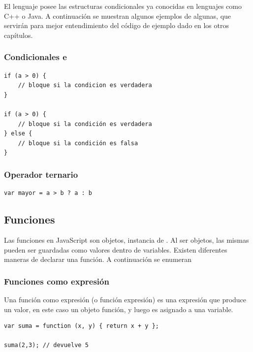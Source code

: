 El lenguaje posee las estructuras condicionales ya conocidas en lenguajes como C++ o Java. A continuación se muestran algunos ejemplos de algunas, que servirán para mejor entendimiento del código de ejemplo dado en los otros capítulos.

\subsubsection{Condicionales  e }

\begin{lstlisting}[title={Ejemplos de \code{if} e \code{if-else}}]
if (a > 0) {
	// bloque si la condicion es verdadera 
}

if (a > 0) {
	// bloque si la condición es verdadera
} else {
	// bloque si la condición es falsa
}
\end{lstlisting}

\subsubsection{Operador ternario }

\begin{lstlisting}[title={Operador ternario \code{?:}}]
var mayor = a > b ? a : b
\end{lstlisting}

\subsection{Funciones}
\label{sec:funciones}

Las funciones en JavaScript son objetos, instancia de . Al ser objetos, las mismas pueden ser guardadas como valores dentro de variables. Existen diferentes maneras de declarar una función. A continuación se enumeran 

\subsubsection{Funciones como expresión}

Una función como expresión (o función expresión) es una expresión que produce un valor, en este caso un objeto función, y luego es asignado a una variable.

\begin{lstlisting}[title={Función expresión}]
var suma = function (x, y) { return x + y };

suma(2,3); // devuelve 5
\end{lstlisting}

